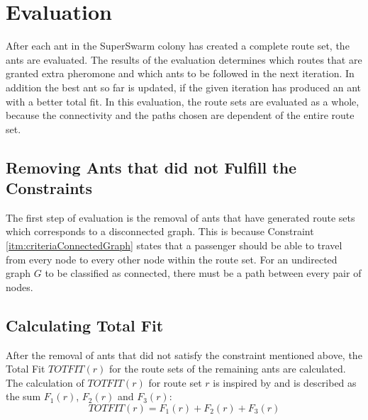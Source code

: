 \section{Evaluation}
\label{sec:algoEvaluation}
After each ant in the SuperSwarm colony has created a complete route set, the ants are evaluated. The results of the evaluation determines which routes that are granted extra pheromone and which ants to be followed in the next iteration. In addition the best ant so far is updated, if the given iteration has produced an ant with a better total fit. In this evaluation, the route sets are evaluated as a whole, because the connectivity and the paths chosen are dependent of the entire route set. 

\subsection{Removing Ants that did not Fulfill the Constraints}
\label{sec:algoRemoval}
The first step of evaluation is the removal of ants that have generated route sets which corresponds to a disconnected graph. This is because Constraint \vref{itm:criteriaConnectedGraph} states that a passenger should be able to travel from every node to every other node within the route set. For an undirected graph $G$ to be classified as connected, there must be a path between every pair of nodes. 

\subsection{Calculating Total Fit}
\label{sec:totfit}
After the removal of ants that did not satisfy the constraint mentioned above, the Total Fit $TOTFIT(r)$ for the route sets of the remaining ants are calculated. The calculation of $TOTFIT(r)$ for route set $r$ is inspired by \citet{kechagiopoulos14} and is described as the sum $F_{1}(r)$, $F_{2}(r)$ and $F_{3}(r)$: 
\newline
$$ TOTFIT(r) = F_{1}(r) + F_{2}(r) + F_{3}(r)$$
